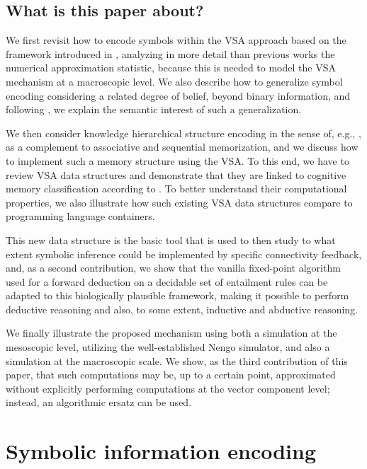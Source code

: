 \documentclass[sn-mathphys]{sn-jnl}
\begin{document}
\subsection{What is this paper about?}

We first revisit how to encode symbols within the VSA approach based on the framework introduced in \cite{eliasmith_how_2013}, analyzing in more detail than previous works the numerical approximation statistic, because this is needed to model the VSA mechanism at a macroscopic level. We also describe how to generalize symbol encoding considering a related degree of belief, beyond binary information, and following \cite{mercier_ontology_2021}, we explain the semantic interest of such a generalization.

We then consider knowledge hierarchical structure encoding in the sense of, e.g., \cite{eichenbaum_memory_2017}, as a complement to associative and sequential memorization, and we discuss how to implement such a memory structure using the VSA. To this end, we have to review VSA data structures and demonstrate that they are linked to cognitive memory classification according to \cite{eichenbaum_memory_2017}. To better understand their computational properties, we also illustrate how such existing VSA data structures compare to programming language containers. 

This new data structure is the basic tool that is used to then study to what extent symbolic inference could be implemented by specific connectivity feedback, and, as a second contribution, we show that the vanilla fixed-point algorithm used for a forward deduction on a decidable set of entailment rules can be adapted to this biologically plausible framework, making it possible to perform deductive reasoning and also, to some extent, inductive and abductive reasoning.

We finally illustrate the proposed mechanism using both a simulation at the mesoscopic level, utilizing the well-established Nengo simulator, and also a simulation at the macroscopic scale. We show, as the third contribution of this paper, that such computations may be, up to a certain point, approximated without explicitly performing computations at the vector component level; instead, an algorithmic ersatz can be used.


\section{Symbolic information encoding} \label{encoding}
\end{document}
